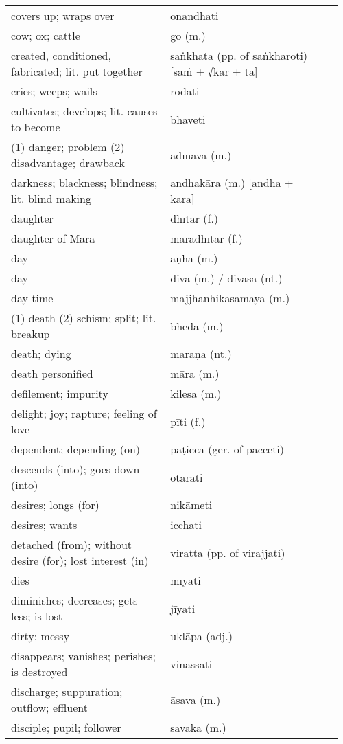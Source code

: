 \documentclass[a5paper]{memoir}
\begin{document}
\begin{longtable}{L{0.48\linewidth} L{0.48\linewidth} H}
covers up; wraps over & onandhati & \\[0pt]
cow; ox; cattle & go (m.) & \\[0pt]
created, conditioned, fabricated; lit. put together & saṅkhata (pp. of saṅkharoti) [saṁ + √kar + ta] & \\[0pt]
cries; weeps; wails & rodati & \\[0pt]
cultivates; develops; lit. causes to become & bhāveti & \\[0pt]
(1) danger; problem (2) disadvantage; drawback & ādīnava (m.) & \\[0pt]
darkness; blackness; blindness; lit. blind making & andhakāra (m.) [andha + kāra] & \\[0pt]
daughter & dhītar (f.) & \\[0pt]
daughter of Māra & māradhītar (f.) & \\[0pt]
day & aṇha (m.) & \\[0pt]
day & diva (m.) / divasa (nt.) & \\[0pt]
day-time & majjhanhikasamaya (m.) & \\[0pt]
(1) death (2) schism; split; lit. breakup & bheda (m.) & \\[0pt]
death; dying & maraṇa (nt.) & \\[0pt]
death personified & māra (m.) & \\[0pt]
defilement; impurity & kilesa (m.) & \\[0pt]
delight; joy; rapture; feeling of love & pīti (f.) & \\[0pt]
dependent; depending (on) & paṭicca (ger. of pacceti) & \\[0pt]
descends (into); goes down (into) & otarati & \\[0pt]
desires; longs (for) & nikāmeti & \\[0pt]
desires; wants & icchati & \\[0pt]
detached (from); without desire (for); lost interest (in) & viratta (pp. of virajjati) & \\[0pt]
dies & mīyati & \\[0pt]
diminishes; decreases; gets less; is lost & jīyati & \\[0pt]
dirty; messy & uklāpa (adj.) & \\[0pt]
disappears; vanishes; perishes; is destroyed & vinassati & \\[0pt]
discharge; suppuration; outflow; effluent & āsava (m.) & \\[0pt]
disciple; pupil; follower & sāvaka (m.) & \\[0pt]

\end{longtable}
\end{document}
